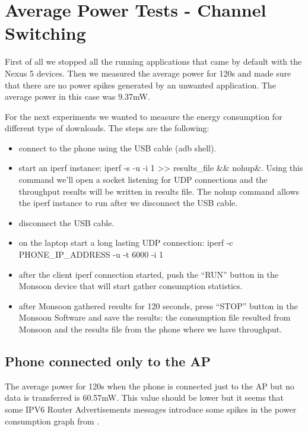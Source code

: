 \newpage
\section{Average Power Tests - Channel Switching}
\label{sec:nexus5-consumption}

First of all we stopped all the running applications that came by default with the Nexus 5 devices. Then we measured the average power for 120s and made sure that there are no power spikes generated by an unwanted application. The average power in this case was 9.37mW.

For the next experiments we wanted to measure the energy consumption for different type of downloads. The steps are the following:
\begin{itemize}
  \item connect to the phone using the USB cable (adb shell).
  \item start an iperf instance: iperf -s -u -i 1 >> results_file \&\& nohup\&. Using this command we'll open a socket listening for UDP connections and the throughput results will be written in results file. The nohup command allows the iperf instance to run after we disconnect the USB cable.
  \item disconnect the USB cable.
  \item on the laptop start a long lasting UDP connection: iperf -c PHONE_IP_ADDRESS -u -t 6000 -i 1
  \item after the client iperf connection started, push the “RUN” button in the Monsoon device that will start gather consumption statistics.
  \item after Monsoon gathered results for 120 seconds, press “STOP” button in the Monsoon Software and save the results: the consumption file resulted from Monsoon and the results file from the phone where we have throughput.
\end{itemize}

\newpage
\subsection{Phone connected only to the AP}
\label{sub-sec:ap-only}
The average power for 120s when the phone is connected just to the AP but no data is transferred is 60.57mW. This value should be lower but it seems that some IPV6 Router Advertisements messages introduce some spikes in the power consumption graph from .


